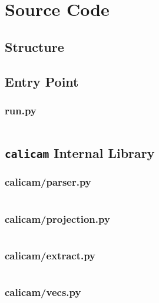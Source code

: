 \clearpage
\section{Source Code} \label{sec:source}

\subsection*{Structure}

\singlespacing

\subsection*{Entry Point} 
\subsubsection*{run.py} \label{code:run}
\inputminted{python}{./calicam/run.py}

\subsection*{\texttt{calicam} Internal Library}
\subsubsection*{calicam/parser.py} \label{code:parser}
\inputminted{python}{./calicam/calicam/parser.py}

\subsubsection*{calicam/projection.py} \label{code:projection}
\inputminted{python}{./calicam/calicam/projection.py}

\subsubsection*{calicam/extract.py} \label{code:extract}
\inputminted{python}{./calicam/calicam/extract.py}

\subsubsection*{calicam/vecs.py} \label{code:vecs}
\inputminted{python}{./calicam/calicam/vecs.py}

\onehalfspacing
